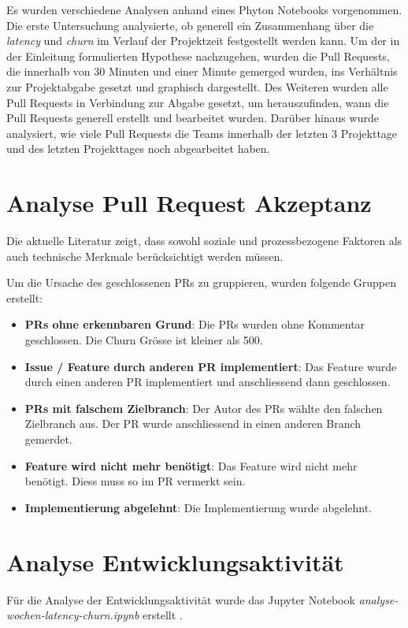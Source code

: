 Es wurden verschiedene Analysen anhand eines Phyton Notebooks vorgenommen. Die erste Untersuchung analysierte, ob generell ein Zusammenhang über die \textit{latency} und \textit{churn} im Verlauf der Projektzeit festgestellt werden kann.  Um der in der Einleitung formulierten Hypothese nachzugehen, wurden die Pull Requests, die innerhalb von 30 Minuten und einer Minute gemerged wurden, ins Verhältnis zur Projektabgabe gesetzt und graphisch dargestellt. Des Weiteren wurden alle Pull Requests in Verbindung zur Abgabe gesetzt, um herauszufinden, wann die Pull Requests generell erstellt und bearbeitet wurden.  Darüber hinaus wurde analysiert, wie viele Pull Requests die Teams innerhalb der letzten 3 Projekttage und des letzten Projekttages noch abgearbeitet haben.


\section{Analyse Pull Request Akzeptanz}
Die aktuelle Literatur zeigt, dass sowohl soziale und prozessbezogene Faktoren als auch technische Merkmale berücksichtigt werden müssen. 

Um die Ursache des geschlossenen PRs zu gruppieren, wurden folgende Gruppen erstellt: 
\begin{itemize}
    \item \textbf{PRs ohne erkennbaren Grund}: Die PRs wurden ohne Kommentar geschlossen. Die Churn Grösse ist kleiner als 500. 
    \item \textbf{Issue / Feature durch anderen PR implementiert}: Das Feature wurde durch einen anderen PR implementiert und anschliessend dann geschlossen. 
    \item \textbf{PRs mit falschem Zielbranch}: Der Autor des PRs wählte den falschen Zielbranch aus. Der PR wurde anschliessend in einen anderen Branch gemerdet. 
    \item \textbf{Feature wird nicht mehr benötigt}: Das Feature wird nicht mehr benötigt. Diess muss so im PR vermerkt sein. 
    \item \textbf{Implementierung abgelehnt}: Die Implementierung wurde abgelehnt. 
\end{itemize}
\pagebreak
\section{Analyse Entwicklungsaktivität}
Für die Analyse der Entwicklungsaktivität wurde das Jupyter Notebook \textit{analyse-wochen-latency-churn.ipynb} erstellt \parencite{stumpf_simon_repo-detectivesba-metric-analysis-scripts_nodate}. 

